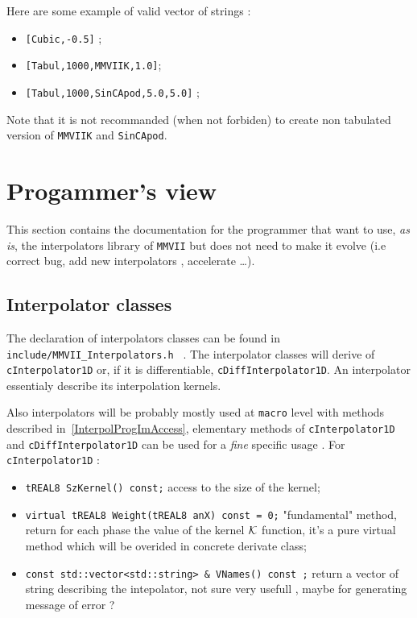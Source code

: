 Here are some example of valid vector of strings :

\begin{itemize}
    \item   {\tt [Cubic,-0.5]} ;
    \item   {\tt [Tabul,1000,MMVIIK,1.0]};
    \item   {\tt [Tabul,1000,SinCApod,5.0,5.0]} ;
\end{itemize}

Note that it is not recommanded (when not forbiden) to create non tabulated version of {\tt MMVIIK} and 
{\tt SinCApod}.


\section{Progammer's view}

This section contains the documentation for the programmer that want to use, \emph{as is}, the
interpolators library of {\tt MMVII} but does not need to make it evolve (i.e correct bug, add new interpolators ,
accelerate \dots).



\subsection{Interpolator classes}

The declaration of interpolators classes can be found in {\tt include/MMVII\_Interpolators.h } .
The interpolator classes will derive of {\tt cInterpolator1D}  or, if it is differentiable,
{\tt cDiffInterpolator1D}.   An interpolator essentialy describe its interpolation kernels.

Also interpolators will be probably mostly used at {\tt macro}
level with  methods described in~\ref{InterpolProgImAccess}, elementary methods
of {\tt cInterpolator1D}  and {\tt cDiffInterpolator1D}
can be used for a \emph{fine} specific usage . For {\tt cInterpolator1D} :

\begin{itemize}
   \item  {\tt tREAL8 SzKernel() const;}  access to the size of the kernel;

   \item  {\tt virtual tREAL8  Weight(tREAL8  anX) const = 0;} "fundamental" method, return
          for each phase the value of the kernel $\mathcal K$  function, it's a pure virtual method
          which will be overided in concrete derivate class;

    \item {\tt const std::vector<std::string> \& VNames() const ;} return a vector of string
          describing the intepolator, not sure very usefull , maybe for generating message of error ?
\end{itemize}

